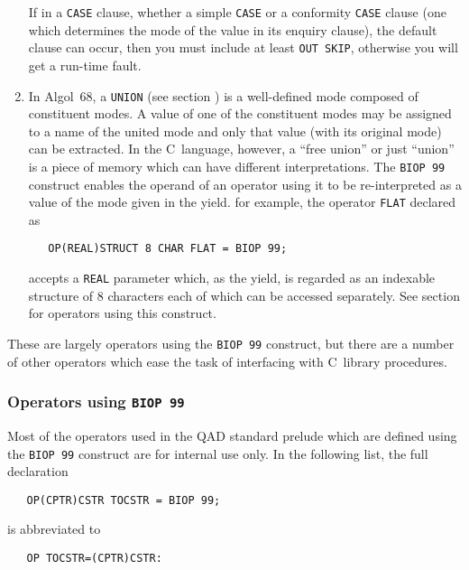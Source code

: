 \begin{enumerate}
If in a \verb|CASE| clause, whether a simple \verb|CASE| or a
conformity \verb|CASE| clause (one which determines the mode of the
value in its enquiry clause), the default clause can occur, then you
must include at least \verb|OUT SKIP|, otherwise you will get a
run-time fault.
\item {}\newline
In Algol~68, a \verb|UNION| (see section ) is a
well-defined mode composed of constituent modes. A value of one of the
constituent modes may be assigned to a name of the united mode and only
that value (with its original mode) can be extracted. In the
C~language, however, a ``free union'' or just ``union'' is a piece of
memory which can have different interpretations. The \verb|BIOP 99|
construct enables the operand of an operator using it to be
re-interpreted as a value of the mode given in the yield. for example,
the operator \verb|FLAT| declared as
\begin{verbatim}
   OP(REAL)STRUCT 8 CHAR FLAT = BIOP 99;
\end{verbatim}
\noindent
accepts a \verb|REAL| parameter which, as the yield, is regarded as an
indexable structure of 8 characters each of which can be accessed
separately. See section  for operators using this
construct.
\end{enumerate}

These are largely operators using the \verb|BIOP 99| construct, but
there are a number of other operators which ease the task of
interfacing with C~library procedures.
\newpage

\subsubsection*{Operators using \texttt{BIOP 99}}
Most of the operators used in the QAD standard prelude which are
defined using the \verb|BIOP 99| construct are for internal use only.
In the following list, the full declaration
\begin{verbatim}
   OP(CPTR)CSTR TOCSTR = BIOP 99;
\end{verbatim}
\noindent
is abbreviated to
\begin{verbatim}
   OP TOCSTR=(CPTR)CSTR:
\end{verbatim}

